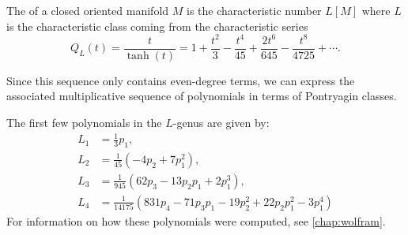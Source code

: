 \begin{definition}
	The  of a closed oriented manifold $M$ is the characteristic number $L[M]$ where $L$ is the characteristic class coming from the characteristic series
	\[
		Q_{L}(t) = \frac{t}{\tanh(t)}=1+\frac{t^2}{3} - \frac{t^4}{45} + \frac{2t^6}{645}-\frac{t^8}{4725}+\cdots.
	\]
\end{definition}

Since this sequence only contains even-degree terms, we can express the associated multiplicative sequence of polynomials in terms of Pontryagin classes.

\begin{example}\label{example:L-genus}
	The first few polynomials in the $L$-genus are given by:
\[
	\begin{aligned}
		L_1 &= \frac{1}{3}p_1,\\
		L_2 &= \frac{1}{45}(-4p_2 + 7p_1^2),\\
		L_3 &= \frac{1}{945}(62p_3-13p_2p_1+2p_1^3),\\
		L_4 &= \frac{1}{14175}(831p_4-71p_3p_1-19p_2^2 + 22p_2p_1^2 - 3p_1^4)
	\end{aligned}
\]
	For information on how these polynomials were computed, see \cref{chap:wolfram}.
\end{example}


